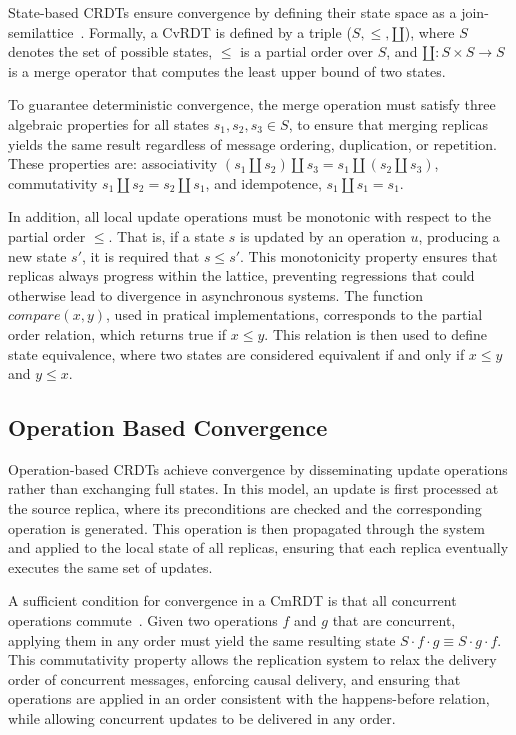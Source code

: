 State-based CRDTs ensure convergence by defining their state space as a join-semilattice~\cite{shapiro2011comprehensive}. Formally, a CvRDT is defined by a triple ($S, \leq, \amalg$), where $S$ denotes the set of possible states, $\leq$ is a partial order over $S$, and $\amalg: S \times S \rightarrow S$ is a merge operator that computes the least upper bound of two states.

To guarantee deterministic convergence, the merge operation must satisfy three algebraic properties for all states $s_1, s_2, s_3 \in S$, to ensure that merging replicas yields the same result regardless of message ordering, duplication, or repetition. These properties are: associativity $(s_1 \amalg s_2) \amalg s_3 = s_1 \amalg (s_2 \amalg s_3)$, commutativity $s_1 \amalg s_2 = s_2 \amalg s_1$, and idempotence, $s_1 \amalg s_1 = s_1$.

In addition, all local update operations must be monotonic with respect to the partial order $\leq$. That is, if a state $s$ is updated by an operation $u$, producing a new state $s'$, it is required that $s \leq s'$. This monotonicity property ensures that replicas always progress within the lattice, preventing regressions that could otherwise lead to divergence in asynchronous systems. The function $compare(x, y)$, used in pratical implementations, corresponds to the partial order relation, which returns true if $x \leq y$. This relation is then used to define state equivalence, where two states are considered equivalent if and only if $x \leq y$ and $y \leq x$.

\subsection{Operation Based Convergence}
\label{sub:operation_convergence}

Operation-based CRDTs achieve convergence by disseminating update operations rather than exchanging full states. In this model, an update is first processed at the source replica, where its preconditions are checked and the corresponding operation is generated. This operation is then propagated through the system and applied to the local state of all replicas, ensuring that each replica eventually executes the same set of updates.

A sufficient condition for convergence in a CmRDT is that all concurrent operations commute~\cite{shapiro2011comprehensive}. Given two operations $f$ and $g$ that are concurrent, applying them in any order must yield the same resulting state $S \cdot f \cdot g \equiv S \cdot g \cdot f$. This commutativity property allows the replication system to relax the delivery order of concurrent messages, enforcing causal delivery, and ensuring that operations are applied in an order consistent with the happens-before relation, while allowing concurrent updates to be delivered in any order.

